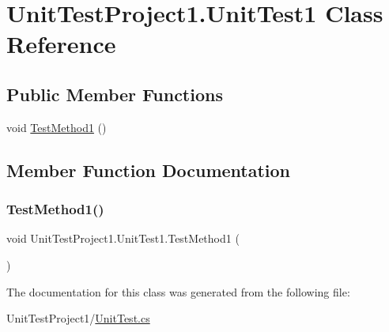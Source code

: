 \hypertarget{class_unit_test_project1_1_1_unit_test1}{}\section{Unit\+Test\+Project1.\+Unit\+Test1 Class Reference}
\label{class_unit_test_project1_1_1_unit_test1}
\subsection*{Public Member Functions}
\begin{DoxyCompactItemize}
\item 
void \hyperlink{class_unit_test_project1_1_1_unit_test1_ab8d78f432b13c60640430a30b20a07fc}{Test\+Method1} ()
\end{DoxyCompactItemize}


\subsection{Member Function Documentation}
\mbox{\label{class_unit_test_project1_1_1_unit_test1_ab8d78f432b13c60640430a30b20a07fc}} 
\subsubsection{\texorpdfstring{Test\+Method1()}{TestMethod1()}}
{\footnotesize\ttfamily void Unit\+Test\+Project1.\+Unit\+Test1.\+Test\+Method1 (\begin{DoxyParamCaption}{ }\end{DoxyParamCaption})}



The documentation for this class was generated from the following file\+:\begin{DoxyCompactItemize}
\item 
Unit\+Test\+Project1/\hyperlink{_unit_test_8cs}{Unit\+Test.\+cs}\end{DoxyCompactItemize}
